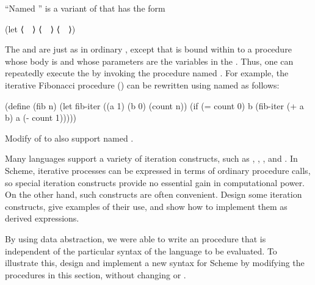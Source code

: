 \begin{exercise}
	\label{Exercise 4.8}
	“Named ” is a variant of  that has the form
	\begin{scheme}
		(let ⟨~~⟩ ⟨~~⟩ ⟨~~⟩)
	\end{scheme}
	The  and  are just as in ordinary , except that  is bound within  to a procedure whose body is  and whose parameters are the variables in the \code{⟨\var{bindings}⟩}.
	Thus, one can repeatedly execute the  by invoking the procedure named \code{⟨\var{var}⟩}.
	For example, the iterative Fibonacci procedure () can be rewritten using named  as follows:
	\begin{scheme}
	  (define (fib n)
	    (let fib-iter ((a 1)
	                   (b 0)
	                   (count n))
	      (if (= count 0)
	          b
	          (fib-iter (+ a b) a (- count 1)))))
	\end{scheme}
	Modify  of  to also support named .
\end{exercise}



\begin{exercise}
	\label{Exercise 4.9}
	Many languages support a variety of iteration constructs, such as , , , and .
	In Scheme, iterative processes can be expressed in terms of ordinary procedure calls, so special iteration constructs provide no essential gain in computational power.
	On the other hand, such constructs are often convenient.
	Design some iteration constructs, give examples of their use, and show how to implement them as derived expressions.
\end{exercise}



\begin{exercise}
	\label{Exercise 4.10}
	By using data abstraction, we were able to write an  procedure that is independent of the particular syntax of the language to be evaluated.
	To illustrate this, design and implement a new syntax for Scheme by modifying the procedures in this section, without changing  or .
\end{exercise}
